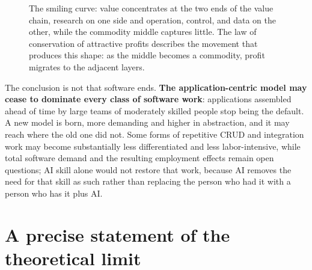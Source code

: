 \documentclass[10pt,oneside,openany]{book}
\begin{document}
\begin{figure}[!htbp]
\centering
{}
\caption{The smiling curve: value concentrates at the two ends of the value chain, research on one side and operation, control, and data on the other, while the commodity middle captures little. The law of conservation of attractive profits describes the movement that produces this shape: as the middle becomes a commodity, profit migrates to the adjacent layers.}
\label{fig:econ-patterns}
\end{figure}

The conclusion is not that software ends. \textbf{The application-centric model may cease to dominate every class of software work}: applications assembled ahead of time by large teams of moderately skilled people stop being the default. A new model is born, more demanding and higher in abstraction, and it may reach where the old one did not. Some forms of repetitive CRUD and integration work may become substantially less differentiated and less labor-intensive, while total software demand and the resulting employment effects remain open questions; AI skill alone would not restore that work, because AI removes the need for that skill as such rather than replacing the person who had it with a person who has it plus AI.

\FloatBarrier
\section{A precise statement of the theoretical limit}
\end{document}
